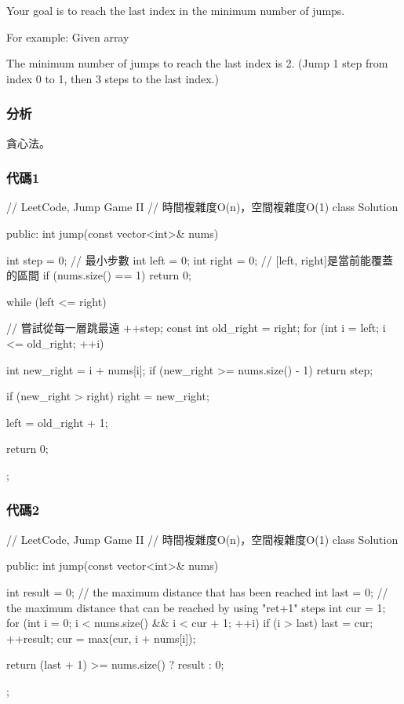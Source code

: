 Your goal is to reach the last index in the minimum number of jumps.

For example:
Given array 

The minimum number of jumps to reach the last index is 2. (Jump 1 step from index 0 to 1, then 3 steps to the last index.)


\subsubsection{分析}
貪心法。


\subsubsection{代碼1}
\begin{Code}
// LeetCode, Jump Game II
// 時間複雜度O(n)，空間複雜度O(1)
class Solution {
public:
    int jump(const vector<int>& nums) {
        int step = 0; // 最小步數
        int left = 0;
        int right = 0;  // [left, right]是當前能覆蓋的區間
        if (nums.size() == 1) return 0;

        while (left <= right) { // 嘗試從每一層跳最遠
            ++step;
            const int old_right = right;
            for (int i = left; i <= old_right; ++i) {
                int new_right = i + nums[i];
                if (new_right >= nums.size() - 1) return step;

                if (new_right > right) right = new_right;
            }
            left = old_right + 1;
        }
        return 0;
    }
};
\end{Code}


\subsubsection{代碼2}
\begin{Code}
// LeetCode, Jump Game II
// 時間複雜度O(n)，空間複雜度O(1)
class Solution {
public:
    int jump(const vector<int>& nums) {
        int result = 0;
        // the maximum distance that has been reached
        int last = 0;
        // the maximum distance that can be reached by using "ret+1" steps
        int cur = 1;
        for (int i = 0; i < nums.size() && i < cur + 1; ++i) {
            if (i > last) {
                last = cur;
                ++result;
            }
            cur = max(cur, i + nums[i]);
        }

        return (last + 1) >= nums.size() ? result : 0;
    }
};
\end{Code}


